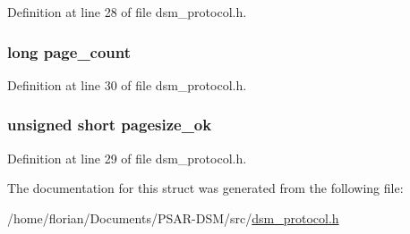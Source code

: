 Definition at line 28 of file dsm\+\_\+protocol.\+h.

\subsubsection[{\texorpdfstring{page\+\_\+count}{page_count}}]{\setlength{\rightskip}{0pt plus 5cm}long page\+\_\+count}\hypertarget{structmsg__connect__ack__args__s_aa218917fa041e4349e66c0ebf231bd80}{}\label{structmsg__connect__ack__args__s_aa218917fa041e4349e66c0ebf231bd80}


Definition at line 30 of file dsm\+\_\+protocol.\+h.

\subsubsection[{\texorpdfstring{pagesize\+\_\+ok}{pagesize_ok}}]{\setlength{\rightskip}{0pt plus 5cm}unsigned short pagesize\+\_\+ok}\hypertarget{structmsg__connect__ack__args__s_a166f9ab1c72d1d4c71f2ebf9da6702c0}{}\label{structmsg__connect__ack__args__s_a166f9ab1c72d1d4c71f2ebf9da6702c0}


Definition at line 29 of file dsm\+\_\+protocol.\+h.



The documentation for this struct was generated from the following file\+:\begin{DoxyCompactItemize}
\item 
/home/florian/\+Documents/\+P\+S\+A\+R-\/\+D\+S\+M/src/\hyperlink{dsm__protocol_8h}{dsm\+\_\+protocol.\+h}\end{DoxyCompactItemize}
